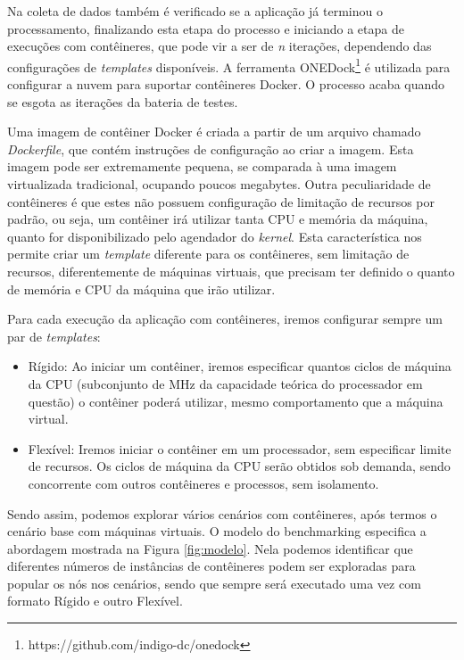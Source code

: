 \documentclass[twoside,english,brazilian]{UNISINOSartigo}
\begin{document}
Na coleta de dados também é verificado se a aplicação já terminou o processamento, finalizando esta etapa do processo e iniciando a etapa de execuções com contêineres, que pode vir a ser de \textit{n} iterações, dependendo das configurações de \textit{templates} disponíveis. A ferramenta ONEDock\footnote{https://github.com/indigo-dc/onedock} é utilizada para configurar a nuvem para suportar contêineres Docker. O processo acaba quando se esgota as iterações da bateria de testes.

Uma imagem de contêiner Docker é criada a partir de um arquivo chamado \textit{Dockerfile}, que contém instruções de configuração ao criar a imagem. Esta imagem pode ser extremamente pequena, se comparada à uma imagem virtualizada tradicional, ocupando poucos megabytes. Outra peculiaridade de contêineres é que estes não possuem configuração de limitação de recursos por padrão, ou seja, um contêiner irá utilizar tanta CPU e memória da máquina, quanto for disponibilizado pelo agendador do \textit{kernel}. Esta característica nos permite criar um \textit{template} diferente para os contêineres, sem limitação de recursos, diferentemente de máquinas virtuais, que precisam ter definido o quanto de memória e CPU da máquina que irão utilizar. 

Para cada execução da aplicação com contêineres, iremos configurar sempre um par de \textit{templates}:
\begin{itemize}
	\item Rígido: Ao iniciar um contêiner, iremos especificar quantos ciclos de máquina da CPU (subconjunto de MHz da capacidade teórica do processador em questão) o contêiner poderá utilizar, mesmo comportamento que a máquina virtual.
	\item Flexível: Iremos iniciar o contêiner em um processador, sem especificar limite de recursos. Os ciclos de máquina da CPU serão obtidos sob demanda, sendo concorrente com outros contêineres e processos, sem isolamento.
\end{itemize} 

Sendo assim, podemos explorar vários cenários com contêineres, após termos o cenário base com máquinas virtuais. O modelo do benchmarking especifica a abordagem mostrada na Figura \ref{fig:modelo}. Nela podemos identificar que diferentes números de instâncias de contêineres podem ser exploradas para popular os nós nos cenários, sendo que sempre será executado uma vez com formato Rígido e outro Flexível.
\end{document}
